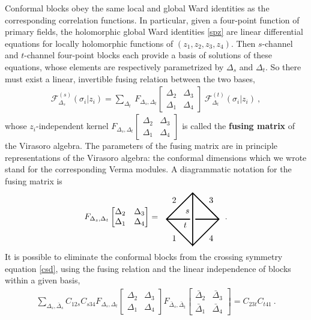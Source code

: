 \documentclass[12pt, a4paper, notitlepage, twoside]{report}
\numberwithin{equation}{section}
\theoremstyle{break}
\begin{document}
Conformal blocks obey the same local and global Ward identities as the corresponding correlation functions.
In particular, given a four-point function of primary fields, the holomorphic global Ward identities \eqref{spz} are linear differential equations for locally holomorphic functions of $(z_1,z_2,z_3,z_4)$.
Then
$s$-channel and $t$-channel four-point blocks each provide a basis of solutions of these equations, whose elements are respectively parametrized by $\Delta_s$ and $\Delta_t$.
So there must exist a linear, invertible fusing relation between the two bases, 
\begin{align}
 \mathcal{F}^{(s)}_{\Delta_s}(\sigma_i|z_i) = \sum_{\Delta_t}\ F_{\Delta_s,\Delta_t}\begin{bmatrix} \Delta_2 & \Delta_3 \\ \Delta_1 & \Delta_4 \end{bmatrix}\ \mathcal{F}^{(t)}_{\Delta_t}(\sigma_i|z_i)\ ,
\end{align}
whose $z_i$-independent kernel $F_{\Delta_s,\Delta_t}\begin{bmatrix} \Delta_2 & \Delta_3 \\ \Delta_1 & \Delta_4 \end{bmatrix}$ is called the \textbf{\boldmath fusing matrix} of the Virasoro algebra.
The parameters of the fusing matrix are in principle representations of the Virasoro algebra: the conformal dimensions which we wrote stand for the corresponding Verma modules.
A diagrammatic notation for the fusing matrix is 
\begin{align}
 F_{\Delta_s,\Delta_t}\begin{bmatrix} \Delta_2 & \Delta_3 \\ \Delta_1 & \Delta_4 \end{bmatrix} = \ \ 
\begin{tikzpicture}[baseline=(current  bounding  box.center), very thick, scale = .55]
\draw (0, -2) -- node [below left] {$1$} (-2, 0) -- node [above left] {$2$} (0, 2) -- node [above right] {$3$} (2, 0) -- node [below right] {$4$} (0, -2) -- (0, 2);
\draw (-2, 0) -- (-.2, 0) node [below left] {$t$}; \draw (.2, 0) -- (2, 0);
\node [above left] at (0, .2) {$s$};
\end{tikzpicture}
\ \ .
\end{align}
It is possible to eliminate the conformal blocks from the crossing symmetry equation \eqref{csd}, using the fusing relation and the linear independence of blocks within a given basis,
\begin{align}
 \sum_{\Delta_s,\bar{\Delta}_s} C_{12s} C_{s34}
F_{\Delta_s,\Delta_t}\begin{bmatrix} \Delta_2 & \Delta_3 \\ \Delta_1 & \Delta_4 \end{bmatrix}
F_{\bar{\Delta}_s,\bar{\Delta}_t}\begin{bmatrix} \bar{\Delta}_2 & \bar{\Delta}_3 \\ \bar{\Delta}_1 & \bar{\Delta}_4 \end{bmatrix}
=  C_{23t}C_{t41}\ .
\end{align}
\end{document}
